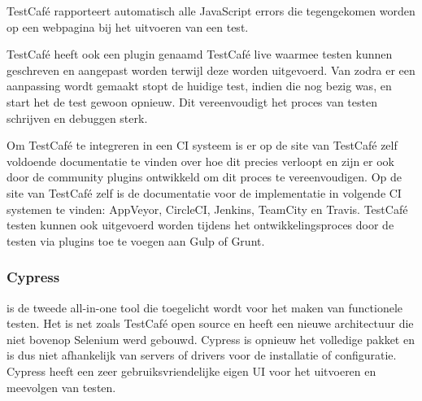 TestCafé rapporteert automatisch alle JavaScript errors die tegengekomen worden op een webpagina bij het uitvoeren van een test.

\clearpage
TestCafé heeft ook een plugin genaamd TestCafé live waarmee testen kunnen geschreven en aangepast worden terwijl deze worden uitgevoerd. Van zodra er een aanpassing wordt gemaakt stopt de huidige test, indien die nog bezig was, en start het de test gewoon opnieuw. Dit vereenvoudigt het proces van testen schrijven en debuggen sterk.


Om TestCafé te integreren in een \gls{CI} systeem is er op de site van TestCafé zelf voldoende documentatie te vinden over hoe dit precies verloopt en zijn er ook door de community plugins ontwikkeld om dit proces te vereenvoudigen. Op de site van TestCafé zelf is de documentatie voor de implementatie in volgende \gls{CI} systemen te vinden: AppVeyor, CircleCI, Jenkins, TeamCity en Travis. TestCafé testen kunnen ook uitgevoerd worden tijdens het ontwikkelingsproces door de testen via plugins toe te voegen aan \gls{Gulp} of \gls{Grunt}. 


\subsubsection{Cypress}
\textcite{Cypress} is de tweede all-in-one \gls{tool} die toegelicht wordt voor het maken van functionele testen. Het is net zoals TestCafé open source en heeft een nieuwe architectuur die niet bovenop Selenium werd gebouwd. Cypress is opnieuw het volledige pakket en is dus niet afhankelijk van servers of drivers voor de installatie of configuratie. Cypress heeft een zeer gebruiksvriendelijke eigen \gls{UI} voor het uitvoeren en meevolgen van testen.

